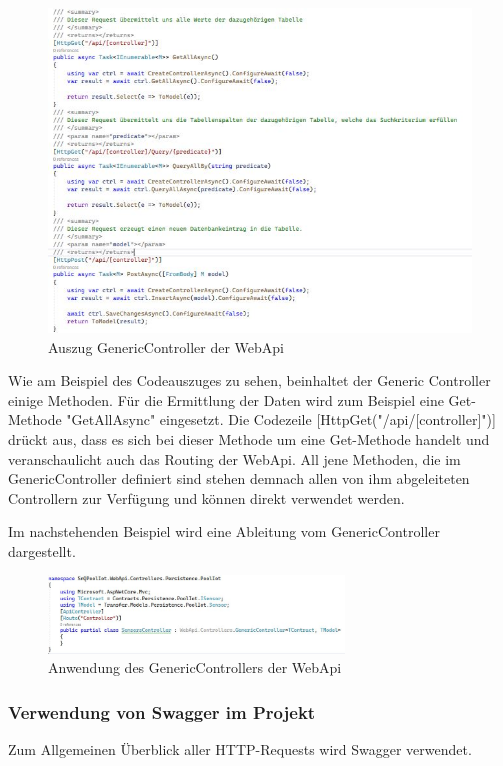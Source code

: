 \begin{figure}[H]
    \centering
    \includegraphics[width=1\textwidth]{pics/GenericControllerWebApi.JPG}
    \caption{Auszug GenericController der WebApi}
\end{figure}

Wie am Beispiel des Codeauszuges zu sehen, beinhaltet der Generic Controller einige Methoden.
Für die Ermittlung der Daten wird zum Beispiel eine Get-Methode "GetAllAsync" eingesetzt.
Die Codezeile [HttpGet("/api/[controller]")] drückt aus, dass es sich bei dieser Methode um eine Get-Methode handelt und veranschaulicht auch das Routing der WebApi.
All jene Methoden, die im GenericController definiert sind stehen demnach allen von ihm abgeleiteten Controllern zur Verfügung und können direkt verwendet werden.

Im nachstehenden Beispiel wird eine Ableitung vom GenericController dargestellt.

\begin{figure}[H]
    \centering
    \includegraphics[width=0.7\textwidth]{pics/VerwendungGenereicController.JPG}
    \caption{Anwendung des GenericControllers der WebApi}
\end{figure}


\subsubsection*{Verwendung von Swagger im Projekt}
Zum Allgemeinen Überblick aller HTTP-Requests wird Swagger verwendet.

